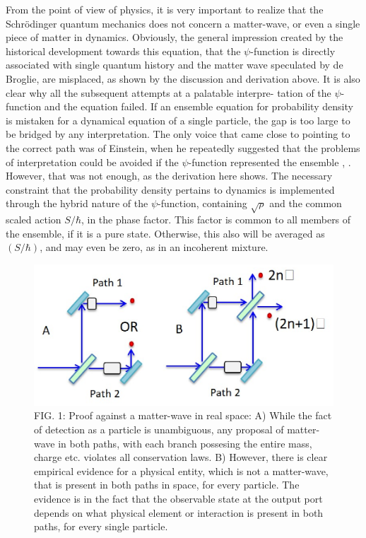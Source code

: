 From the point of view of physics, it is very important to realize that the Schr\"{o}dinger
quantum mechanics does not concern a matter-wave, or even a single piece of matter in
dynamics. Obviously, the general impression created by the historical development towards
this equation, that the $\psi$-function is directly associated with single quantum history and
the matter wave speculated by de Broglie, are misplaced, as shown by the discussion and
derivation above. It is also clear why all the subsequent attempts at a palatable interpre-
tation of the $\psi$-function and the equation failed. If an ensemble equation for probability
density is mistaken for a dynamical equation of a single particle, the gap is too large to be
bridged by any interpretation. The only voice that came close to pointing to the correct path
was of Einstein, when he repeatedly suggested that the problems of interpretation could be
avoided if the $\psi$-function represented the ensemble \cite{chap27-key3}, \cite{chap27-key4}. However, that was not enough, as
the derivation here shows. The necessary constraint that the probability density pertains to
dynamics is implemented through the hybrid nature of the $\psi$-function, containing $\sqrt{\rho}$ and
the common scaled action $S/\hbar$, in the phase factor. This factor is common to all members
of the ensemble, if it is a pure state. Otherwise, this also will be averaged as $(S/\hbar)$, and
may even be zero, as in an incoherent mixture.
\begin{figure}[H]
\centering
\includegraphics[scale=0.75]{src/images/chap27/1.eps}
\caption{FIG. 1: Proof against a matter-wave in real space: A) While the fact of detection as a particle is
unambiguous, any proposal of matter-wave in both paths, with each branch possesing the entire
mass, charge etc. violates all conservation laws. B) However, there is clear empirical evidence for
a physical entity, which is not a matter-wave, that is present in both paths in space, for every
particle. The evidence is in the fact that the observable state at the output port depends on what
physical element or interaction is present in both paths, for every single particle.}
\end{figure}


